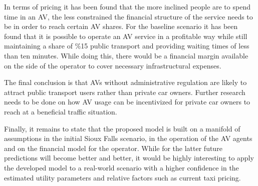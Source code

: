 In terms of pricing it has been found that the more inclined people are to spend
time in an AV, the less constrained the financial structure of the service needs
to be in order to reach certain AV shares. For the baseline scenario it has been
found that it is possible to operate an AV service in a profitable way while still
maintaining a share of \%15 public transport and providing waiting times of less
than ten minutes. While doing this, there would be a financial margin available
on the side of the operator to cover necessary infrastructural expenses.

The final conclusion is that AVs without administrative regulation are likely to
attract public transport users rather than private car owners. Further research
needs to be done on how AV usage can be incentivized for private car owners to
reach at a beneficial traffic situation.

Finally, it remains to state that the proposed model is built on a manifold of
assumptions in the initial Sioux Falls scenario, in the operation of the AV
agents and on the financial model for the operator. While for the latter future
predictions will become better and better, it would be highly interesting to apply
the developed model to a real-world scenario with a higher confidence in the estimated
utility parameters and relative factors such as current taxi pricing.
